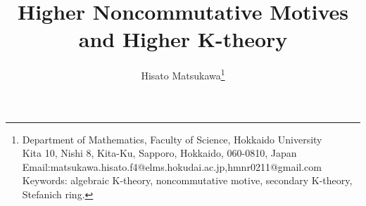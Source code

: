 \documentclass[a4paper,11pt]{article}
\title{Higher Noncommutative Motives and Higher K-theory}
\author{Hisato Matsukawa\thanks{Department of Mathematics, Faculty of Science, Hokkaido University\\Kita 10, Nishi 8, Kita-Ku, Sapporo, Hokkaido, 060-0810, Japan\\Email:matsukawa.hisato.f4@elms.hokudai.ac.jp,hmnr0211@gmail.com\\
Keywords: algebraic K-theory, noncommutative motive, secondary K-theory, Stefanich ring.}}
\date{}
\numberwithin{equation}{section}
\theoremstyle{plain}
\theoremstyle{definition}
\theoremstyle{remark}
\begin{document}
\maketitle
\begin{abstract}

\end{abstract}



\end{document}
